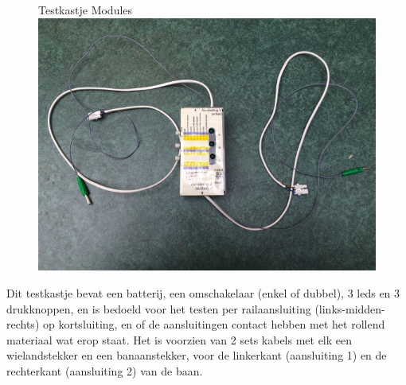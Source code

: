 \documentclass[12pt,a4paper]{report}
\begin{document}
\begin{figure}[!ht]
  \captionbox
  {Testkastje Modules\label{im:testkastje}}
  {\includegraphics[scale=1.0]{images/rcu_foto2}\\}
\end{figure}

Dit testkastje bevat een batterij, een omschakelaar (enkel of dubbel), 3 leds en 3 drukknoppen, en is bedoeld voor het testen per railaansluiting (links-midden-rechts) op kortsluiting, en of de aansluitingen contact hebben met het rollend materiaal wat erop staat. 
Het is voorzien van 2 sets kabels met elk een wielandstekker en een banaanstekker, voor de linkerkant (aansluiting 1) en de rechterkant (aansluiting 2) van de baan.
\end{document}
